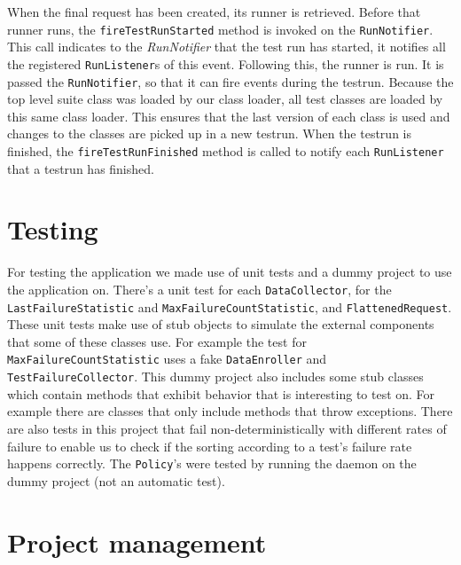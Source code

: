 \documentclass[i2]{oss}
\newcommand{\class}[1]{\texttt{#1}}
\newcommand{\method}[1]{\texttt{#1}}
\begin{document}
When the final request has been created, its runner is retrieved. Before that runner runs, the \method{fireTestRunStarted} method is invoked on the \class{RunNotifier}. This call indicates to the \emph{RunNotifier} that the test run has started, it notifies all the registered \class{RunListener}s of this event.
Following this, the runner is run. It is passed the \class{RunNotifier}, so that it can fire events during the testrun. Because the top level suite class was loaded by our class loader, all test classes are loaded by this same class loader. This ensures that the last version of each class is used and changes to the classes are picked up in a new testrun.
When the testrun is finished, the \method{fireTestRunFinished} method is called to notify each \class{RunListener} that a testrun has finished.



\section{Testing}
\label{ssec:testing}

For testing the application we made use of unit tests and a dummy project to use the application on.
There's a unit test for each \class{DataCollector}, for the 
\class{LastFailureStatistic} and \class{MaxFailureCountStatistic}, and  \class{FlattenedRequest}.
These unit tests make use of stub objects to simulate the external 
components that some of these classes use.
For example the test for \class{MaxFailureCountStatistic} uses a fake
\class{DataEnroller} and \class{TestFailureCollector}.
This dummy project also includes some stub classes which contain methods 
that exhibit behavior that is interesting to test on.
For example there are classes that only include methods that throw 
exceptions.
There are also tests in this project that fail non-deterministically with 
different rates of failure to enable us to check if the sorting according 
to a test's failure rate happens correctly.
The \class{Policy}'s were tested by running the daemon on the dummy 
project (not an automatic test).



\section{Project management}
\label{ssec:Projectmanag}
\end{document}
